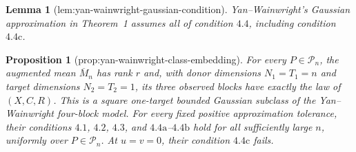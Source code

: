\documentclass{article}
\newtheorem{lemma}{Lemma}
\newtheorem{proposition}{Proposition}
\begin{document}
\begin{lemma}[lem:yan-wainwright-gaussian-condition]\label{lem:yan-wainwright-gaussian-condition}
Yan--Wainwright's Gaussian approximation in Theorem~1 assumes all of condition \(4.4\), including condition \(4.4\mathrm{c}\).
\end{lemma}

\begin{proposition}[prop:yan-wainwright-class-embedding]\label{prop:yan-wainwright-class-embedding}
For every \(P\in\mathcal P_n\), the augmented mean \(\overline M_n\) has rank \(r\) and, with donor dimensions \(N_1=T_1=n\) and target dimensions \(N_2=T_2=1\), its three observed blocks have exactly the law of \((X,C,R)\).  This is a square one-target bounded Gaussian subclass of the Yan--Wainwright four-block model.  For every fixed positive approximation tolerance, their conditions \(4.1\), \(4.2\), \(4.3\), and \(4.4\mathrm{a}\)--\(4.4\mathrm{b}\) hold for all sufficiently large \(n\), uniformly over \(P\in\mathcal P_n\).  At \(u=v=0\), their condition \(4.4\mathrm{c}\) fails.
\end{proposition}
\end{document}
